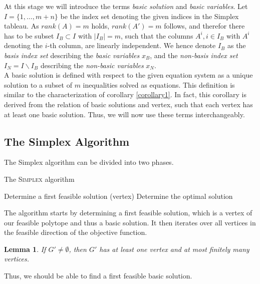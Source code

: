 \documentclass[a4paper, 11pt]{article}
\newtheorem{lemma}{Lemma}
\begin{document}
At this stage we will introduce the terms \textit{basic solution} and \textit{basic variables}. Let $I=\{1,\dots,m+n\}$ be the index set denoting the given indices in the Simplex tableau. As $rank(A)=m$ holds, $rank(A')=m$ follows, and therefor there has to be subset $I_B \subset I$ with $|I_B| = m$, such that the columns $A^i, i\in I_B$ with $A^i$ denoting the $i$-th column, are linearly independent. We hence denote $I_B$ as the \textit{basis index set} describing the \textit{basic variables} $x_B$, and the \textit{non-basis index set} $I_N=I\backslash I_B$ describing the \textit{non-basic variables} $x_N$.\\

A basic solution is defined with respect to the given equation system as a unique solution to a subset of $m$ inequalities solved as equations. This definition is similar to the characterization of corollary \ref{corollary1}. In fact, this corollary is derived from the relation of basic solutions and vertex, such that each vertex has at least one basic solution. Thus, we will now use these terms interchangeably.

\subsection{The Simplex Algorithm}
The Simplex algorithm can be divided into two phases.
\begin{algorithm}[H]
	\caption{The \textsc{Simplex} algorithm}
	\label{alg:seq}
	\begin{algorithmic}[1]
		\STATE Determine a first feasible solution (vertex)
		\STATE Determine the optimal solution
	\end{algorithmic}
\end{algorithm}

The algorithm starts by determining a first feasible solution, which is a vertex of our feasible polytope and thus a basic solution. It then iterates over all vertices in the feasible direction of the objective function.

\begin{lemma}
	If $G'\neq\emptyset$, then $G'$ has at least one vertex and at most finitely many vertices.
\end{lemma}

Thus, we should be able to find a first feasible basic solution.
\end{document}
